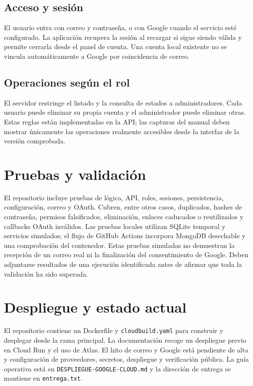 \subsection{Acceso y sesión}
El usuario entra con correo y contraseña, o con Google cuando el servicio esté configurado. La aplicación recupera la sesión al recargar si sigue siendo válida y permite cerrarla desde el panel de cuenta. Una cuenta local existente no se vincula automáticamente a Google por coincidencia de correo.
\subsection{Operaciones según el rol}
El servidor restringe el listado y la consulta de estados a administradores. Cada usuario puede eliminar su propia cuenta y el administrador puede eliminar otras. Estas reglas están implementadas en la API; las capturas del manual deben mostrar únicamente las operaciones realmente accesibles desde la interfaz de la versión comprobada.

\section{Pruebas y validación}
El repositorio incluye pruebas de lógica, API, roles, sesiones, persistencia, configuración, correo y OAuth. Cubren, entre otros casos, duplicados, hashes de contraseña, permisos falsificados, eliminación, enlaces caducados o reutilizados y callbacks OAuth inválidos. Las pruebas locales utilizan SQLite temporal y servicios simulados; el flujo de GitHub Actions incorpora MongoDB desechable y una comprobación del contenedor.
Estas pruebas simuladas no demuestran la recepción de un correo real ni la finalización del consentimiento de Google. Deben adjuntarse resultados de una ejecución identificada antes de afirmar que toda la validación ha sido superada.

\section{Despliegue y estado actual}
El repositorio contiene un Dockerfile y \texttt{cloudbuild.yaml} para construir y desplegar desde la rama principal. La documentación recoge un despliegue previo en Cloud Run y el uso de Atlas. El hito de correo y Google está pendiente de alta y configuración de proveedores, secretos, despliegue y verificación pública. La guía operativa está en \texttt{DESPLIEGUE-GOOGLE-CLOUD.md} y la dirección de entrega se mantiene en \texttt{entrega.txt}.
